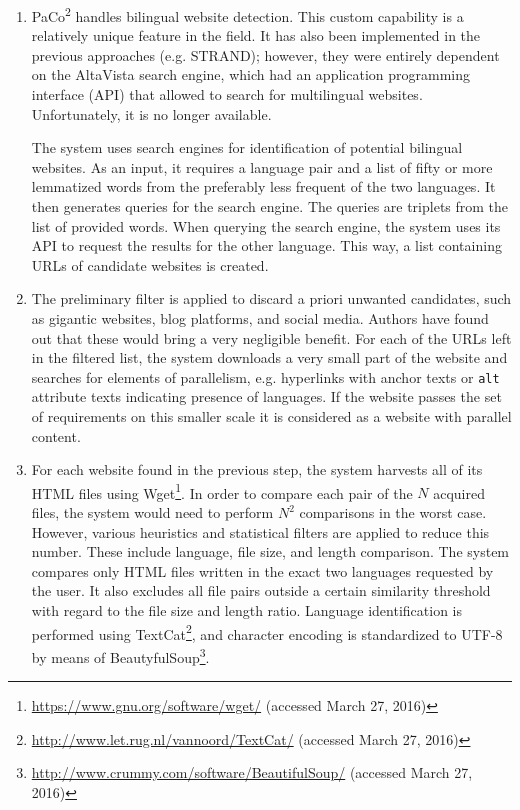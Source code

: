 \begin{enumerate}
	\item PaCo\textsuperscript{2} handles bilingual website detection. This custom capability is a relatively unique feature in the field. It has also been implemented in the previous approaches (e.g. STRAND); however, they were entirely dependent on the AltaVista search engine, which had an application programming interface (API) that allowed to search for multilingual websites. Unfortunately, it is no longer available. 
	
	The system uses search engines for identification of potential bilingual websites. As an input, it requires a language pair and a list of fifty or more lemmatized words from the preferably less frequent of the two languages. It then generates queries for the search engine. The queries are triplets from the list of provided words. When querying the search engine, the system uses its API to request the results for the other language. This way, a list containing URLs of candidate websites is created. 
	
	\item The preliminary filter is applied to discard a priori unwanted candidates, such as gigantic websites, blog platforms, and social media. Authors have found out that these would bring a very negligible benefit. For each of the URLs left in the filtered list, the system downloads a very small part of the website and searches for elements of parallelism, e.g. hyperlinks with anchor texts or \texttt{alt} attribute texts indicating presence of languages. If the website passes the set of requirements on this smaller scale it is considered as a website with parallel content.
	
	\item For each website found in the previous step, the system harvests all of its HTML files using Wget\footnote{\url{https://www.gnu.org/software/wget/} (accessed March 27, 2016)}. In order to compare each pair of the $N$ acquired files, the system would need to perform $N^2$ comparisons in the worst case. However, various heuristics and statistical filters are applied to reduce this number. These include language, file size, and length comparison. The system compares only HTML files written in the exact two languages requested by the user. It also excludes all file pairs outside a certain similarity threshold with regard to the file size and length ratio. Language identification is performed using TextCat\footnote{\url{http://www.let.rug.nl/vannoord/TextCat/} (accessed March 27, 2016)}, and character encoding is standardized to UTF-8 by means of BeautyfulSoup\footnote{\url{http://www.crummy.com/software/BeautifulSoup/} (accessed March 27, 2016)}. 
	

\end{enumerate}
